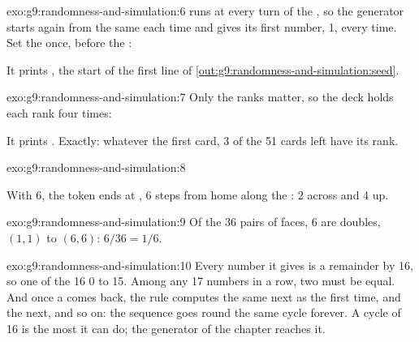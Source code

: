 \begin{solution}{exo:g9:randomness-and-simulation:6}
 runs at every turn of the , so the generator
starts again from the same  each time and gives its first number, 1, every
time. Set the  once, before the :

\label{lst:g9:randomness-and-simulation:sol-seed}

It prints \code{[1, 3, 5, 5, 6, 1, 2, 5]}, the start of the first line of
\cref{out:g9:randomness-and-simulation:seed}.
\end{solution}

\begin{solution}{exo:g9:randomness-and-simulation:7}
Only the ranks matter, so the deck holds each rank four times:

\label{lst:g9:randomness-and-simulation:sol-pair}

It prints . Exactly: whatever the
first card, 3 of the 51 cards left have its rank.
\end{solution}

\begin{solution}{exo:g9:randomness-and-simulation:8}
\label{lst:g9:randomness-and-simulation:sol-grid}

With  6, the token ends at , 6 steps from home along the :
2 across and 4 up.
\end{solution}

\begin{solution}{exo:g9:randomness-and-simulation:9}
Of the 36 pairs of faces, 6 are doubles, $(1, 1)$ to $(6, 6)$: $6/36 = 1/6$.
\end{solution}

\begin{solution}{exo:g9:randomness-and-simulation:10}
Every number it gives is a remainder by 16, so one of the 16  0 to 15.
Among any 17 numbers in a row, two must be equal. And once a  comes back,
the rule computes the same next  as the first time, and the next, and so
on: the sequence goes round the same cycle forever. A cycle of 16 is the most
it can do; the generator of the chapter reaches it.
\end{solution}

